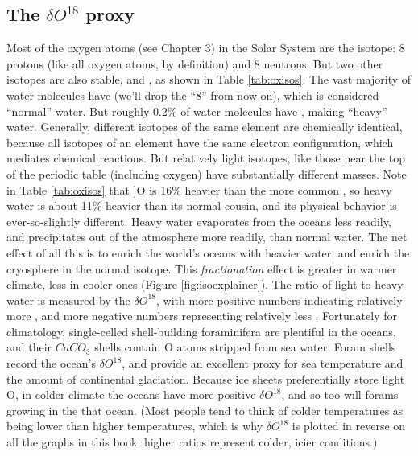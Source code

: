 \documentclass[amstex,12pt]{book}
\begin{document}
\subsection{The $\delta O^{18}$ proxy}
Most of the oxygen atoms (see Chapter 3) in the Solar System are the  isotope: 8 protons (like all oxygen atoms, by definition) and 8 neutrons. But two other isotopes are also stable,  and , as shown in Table \ref{tab:oxisos}. The vast majority of water molecules have (we'll drop the ``8'' from now on), which is considered ``normal'' water. But roughly 0.2\% of water molecules have , making ``heavy'' water. Generally, different isotopes of the same element are chemically identical, because all isotopes of an element have the same electron configuration, which mediates chemical reactions. But relatively light isotopes, like those near the top of the periodic table (including oxygen) have substantially different masses. Note in Table \ref{tab:oxisos} that \isotope[18]]{O} is 16\% heavier than the more common , so heavy water is about 11\% heavier than its normal cousin, and its physical behavior is ever-so-slightly different. Heavy water evaporates from the oceans less readily, and precipitates out of the atmosphere more readily, than normal water. The net effect of all this is to enrich the world's oceans with heavier water, and enrich the cryosphere in the normal isotope. This \emph{fractionation} effect is greater in warmer climate, less in cooler ones (Figure \ref{fig:isoexplainer}). The ratio of light to heavy water is measured by the $\delta O^{18}$, with more positive numbers indicating relatively more , and more negative numbers representing relatively less . Fortunately for climatology, single-celled shell-building foraminifera are plentiful in the oceans, and their $CaCO_3$ shells contain O atoms stripped from sea water. Foram shells record the ocean's $\delta O^{18}$, and provide an excellent proxy for sea temperature and the amount of continental glaciation. Because ice sheets preferentially store light O, in colder climate the oceans have more positive $\delta O^{18}$, and so too will forams growing in the that ocean. (Most people tend to think of colder temperatures as being lower than higher temperatures, which is why $\delta O^{18}$ is plotted in reverse on all the graphs in this book: higher ratios represent colder, icier conditions.)
\end{document}
